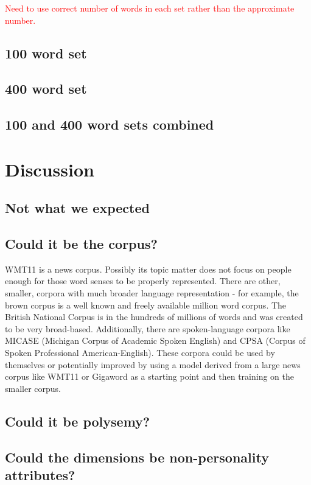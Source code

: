 \documentclass[10pt,letterpaper]{book}
\newcommand{\todo}[1]{\textcolor{red}{#1}}
\begin{document}
\todo{Need to use correct number of words in each set rather than the approximate number.}

\section{100 word set}

\section{400 word set}

\section{100 and 400 word sets combined}

\chapter{Discussion}

\section{Not what we expected}

\section{Could it be the corpus?}

WMT11 is a news corpus. Possibly its topic matter does not focus on people enough for those word senses to be properly represented. There are other, smaller, corpora with much broader language representation - for example, the brown corpus is a well known and freely available million word corpus. The British National Corpus is in the hundreds of millions of words and was created to be very broad-based. Additionally, there are spoken-language corpora like MICASE (Michigan Corpus of Academic Spoken English) and CPSA (Corpus of Spoken Professional American-English). These corpora could be used by themselves or potentially improved by using a model derived from a large news corpus like WMT11 or Gigaword as a starting point and then training on the smaller corpus.

\section{Could it be polysemy?}

\section{Could the dimensions be non-personality attributes?}
\end{document}
